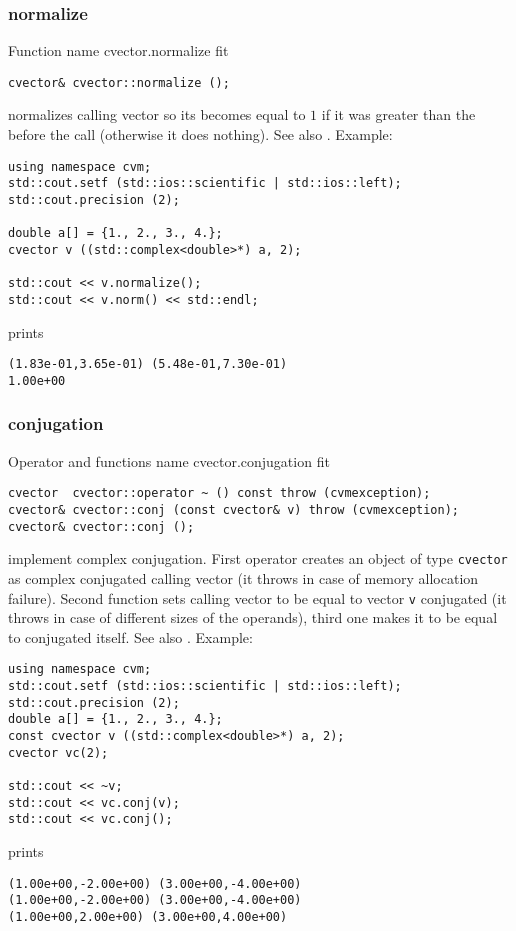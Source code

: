 \subsubsection{normalize}
Function%
\pdfdest name {cvector.normalize} fit
\begin{verbatim}
cvector& cvector::normalize ();
\end{verbatim}
normalizes  calling vector so its 
becomes equal to $1$ if it was greater than the
before the call (otherwise it does nothing).
See also .
Example:
\begin{Verbatim}
using namespace cvm;
std::cout.setf (std::ios::scientific | std::ios::left);
std::cout.precision (2);

double a[] = {1., 2., 3., 4.};
cvector v ((std::complex<double>*) a, 2);

std::cout << v.normalize();
std::cout << v.norm() << std::endl;
\end{Verbatim}
prints
\begin{Verbatim}
(1.83e-01,3.65e-01) (5.48e-01,7.30e-01)
1.00e+00
\end{Verbatim}
\newpage



\subsubsection{conjugation}
Operator and functions%
\pdfdest name {cvector.conjugation} fit
\begin{verbatim}
cvector  cvector::operator ~ () const throw (cvmexception);
cvector& cvector::conj (const cvector& v) throw (cvmexception);
cvector& cvector::conj ();
\end{verbatim}
implement complex conjugation.
First operator creates an object of type \verb"cvector" as
 complex conjugated calling vector
(it throws 
in case of memory allocation failure).
Second function sets calling vector to be equal to vector
\verb"v" conjugated
(it throws 
in case of different sizes of the operands),
third one makes it to be equal to
conjugated itself.
See also .
Example:
\begin{Verbatim}
using namespace cvm;
std::cout.setf (std::ios::scientific | std::ios::left);
std::cout.precision (2);
double a[] = {1., 2., 3., 4.};
const cvector v ((std::complex<double>*) a, 2);
cvector vc(2);

std::cout << ~v;
std::cout << vc.conj(v);
std::cout << vc.conj();
\end{Verbatim}
prints
\begin{Verbatim}
(1.00e+00,-2.00e+00) (3.00e+00,-4.00e+00)
(1.00e+00,-2.00e+00) (3.00e+00,-4.00e+00)
(1.00e+00,2.00e+00) (3.00e+00,4.00e+00)
\end{Verbatim}
\newpage


